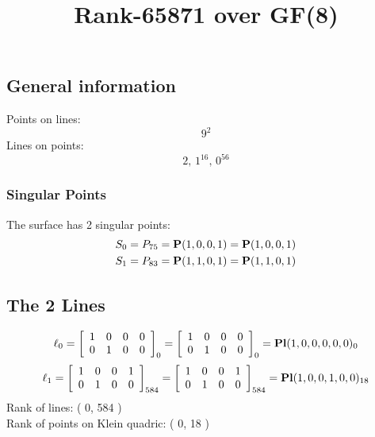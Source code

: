 \documentclass{article}
\newcommand\setTBstruts{\def\T{\rule{0pt}{2.6ex}}%
\def\B{\rule[-1.2ex]{0pt}{0pt}}}
\newcommand{\bP}{{\bf P}}
\begin{document}
 
\setTBstruts



{\allowdisplaybreaks%






\title{Rank-65871 over GF(8)}
\author{}%
\maketitle%
%
{}



\subsection*{General information}
Points on lines:
$$
9^2$$
Lines on points:
$$
2,\,1^{16},\,0^{56}$$
\subsubsection*{Singular Points}
The surface has 2 singular points:\\
\begin{align*}
S_{0} &= P_{75}=\bP(1, 0, 0, 1) = \bP(1, 0, 0, 1)\\
S_{1} &= P_{83}=\bP(1, 1, 0, 1) = \bP(1, 1, 0, 1)\\
\end{align*}
\subsection*{The 2 Lines}
$$
\ell_{0} = 
\left[
\begin{array}{*{4}{r}}
1 & 0 & 0 & 0\\
0 & 1 & 0 & 0\\
\end{array}
\right]
_{0}
=
\left[
\begin{array}{*{4}c}
1  & 0  & 0  & 0\\
0  & 1  & 0  & 0\\
\end{array}
\right]_{0}
={\rm\bf Pl}(1,0,0,0,0,0 )_{0}$$
$$
\ell_{1} = 
\left[
\begin{array}{*{4}{r}}
1 & 0 & 0 & 1\\
0 & 1 & 0 & 0\\
\end{array}
\right]
_{584}
=
\left[
\begin{array}{*{4}c}
1  & 0  & 0  & 1\\
0  & 1  & 0  & 0\\
\end{array}
\right]_{584}
={\rm\bf Pl}(1,0,0,1,0,0 )_{18}$$
Rank of lines: ( 0, 584 )\\
Rank of points on Klein quadric: ( 0, 18 )\\
}
\end{document}
